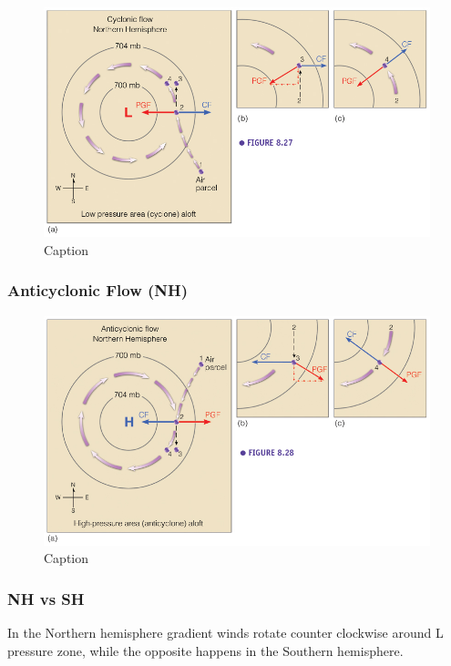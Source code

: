 \documentclass[12pt,oneside]{book}
\begin{document}
\begin{figure}

{\centering \includegraphics[width=0.8\linewidth]{figures/Figure410} 

}

\caption{Caption}\label{fig:CF}
\end{figure}

\subsubsection{Anticyclonic Flow (NH)}\label{anticyclonic-flow-nh}

\begin{figure}

{\centering \includegraphics[width=0.8\linewidth]{figures/Figure411} 

}

\caption{Caption}\label{fig:ACF}
\end{figure}

\subsubsection{NH vs SH}\label{nh-vs-sh}

In the Northern hemisphere gradient winds rotate counter clockwise
around L pressure zone, while the opposite happens in the Southern
hemisphere.
\end{document}
